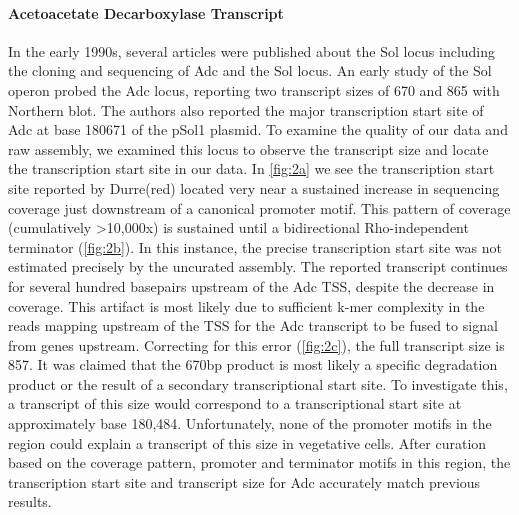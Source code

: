 \paragraph{Acetoacetate Decarboxylase Transcript}
In the early 1990s, several articles were published about the Sol locus including the cloning and sequencing of Adc and the Sol locus\cite{62,63,64,65,66}. An early study of the Sol operon probed the Adc locus, reporting two transcript sizes of 670 and 865 with Northern blot\cite{65}. The authors also reported the major transcription start site of Adc at base 180671 of the pSol1 plasmid. To examine the quality of our data and raw assembly, we examined this locus to observe the transcript size and locate the transcription start site in our data. In \ref{fig:2a} we see the transcription start site reported by Durre(red) located very near a sustained increase in sequencing coverage just downstream of a canonical promoter motif. This pattern of coverage (cumulatively \textgreater 10,000x) is sustained until a bidirectional Rho-independent terminator (\ref{fig:2b}). In this instance, the precise transcription start site was not estimated precisely by the uncurated assembly. The reported transcript continues for several hundred basepairs upstream of the Adc TSS, despite the decrease in coverage. This artifact is most likely due to sufficient k-mer complexity in the reads mapping upstream of the TSS for the Adc transcript to be fused to signal from genes upstream. Correcting for this error (\ref{fig:2c}), the full transcript size is 857. It was claimed that the 670bp product is most likely a specific degradation product or the result of a secondary transcriptional start site\cite{65}. To investigate this, a transcript of this size would correspond to a transcriptional start site at approximately base 180,484. Unfortunately, none of the promoter motifs in the region could explain a transcript of this size in vegetative cells. After curation based on the coverage pattern, promoter and terminator motifs in this region, the transcription start site and transcript size for Adc accurately match previous results. 

